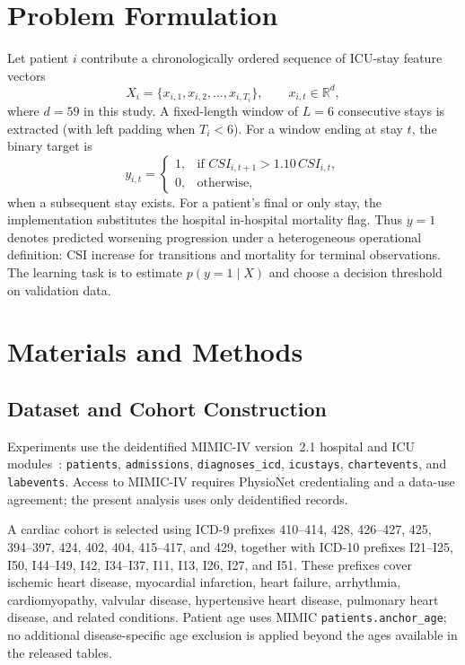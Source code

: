 \documentclass[conference]{IEEEtran}
\begin{document}
\section{Problem Formulation}
Let patient $i$ contribute a chronologically ordered sequence of ICU-stay feature vectors
\begin{equation}
X_i = \{x_{i,1}, x_{i,2}, \ldots, x_{i,T_i}\}, \qquad x_{i,t}\in\mathbb{R}^{d},
\end{equation}
where $d=59$ in this study. A fixed-length window of $L=6$ consecutive stays is extracted (with left padding when $T_i<6$). For a window ending at stay $t$, the binary target is
\begin{equation}
y_{i,t}=
\begin{cases}
1, & \text{if } CSI_{i,t+1}>1.10\,CSI_{i,t},\\
0, & \text{otherwise,}
\end{cases}
\end{equation}
when a subsequent stay exists. For a patient's final or only stay, the implementation substitutes the hospital in-hospital mortality flag. Thus $y=1$ denotes predicted worsening progression under a heterogeneous operational definition: CSI increase for transitions and mortality for terminal observations. The learning task is to estimate $p(y=1\mid X)$ and choose a decision threshold on validation data.

\section{Materials and Methods}

\subsection{Dataset and Cohort Construction}
Experiments use the deidentified MIMIC-IV version~2.1 hospital and ICU modules~\cite{johnson2023mimic,johnson2022mimiciv21,goldberger2000physionet}: \texttt{patients}, \texttt{admissions}, \texttt{diagnoses\_icd}, \texttt{icustays}, \texttt{chartevents}, and \texttt{labevents}. Access to MIMIC-IV requires PhysioNet credentialing and a data-use agreement; the present analysis uses only deidentified records.

A cardiac cohort is selected using ICD-9 prefixes 410--414, 428, 426--427, 425, 394--397, 424, 402, 404, 415--417, and 429, together with ICD-10 prefixes I21--I25, I50, I44--I49, I42, I34--I37, I11, I13, I26, I27, and I51. These prefixes cover ischemic heart disease, myocardial infarction, heart failure, arrhythmia, cardiomyopathy, valvular disease, hypertensive heart disease, pulmonary heart disease, and related conditions. Patient age uses MIMIC \texttt{patients.anchor\_age}; no additional disease-specific age exclusion is applied beyond the ages available in the released tables.
\end{document}
